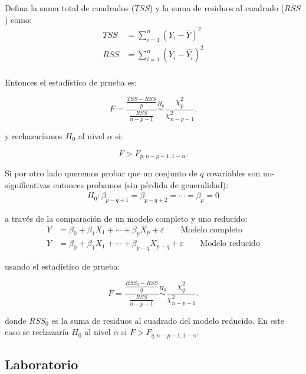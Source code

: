 \documentclass[
  12pt,
]{book}
\theoremstyle{definition}
\theoremstyle{definition}
\theoremstyle{definition}
\theoremstyle{definition}
\theoremstyle{remark}
\begin{document}
Defina la suma total de cuadrados (\(TSS\)) y la suma de residuos al cuadrado (\(RSS\)) como:
\begin{align*}
 TSS &= \sum_{i=1}^{n} \left( Y_{i} -\overline{Y} \right)^{2} \\
 RSS &= \sum_{i=1}^{n} \left( Y_{i} -\hat{Y_i} \right)^{2} \\
 \end{align*}

Entonces el estadístico de prueba es:

\begin{equation*}
 F = \frac{\frac{TSS-RSS}{p}}{\frac{RSS}{n-p-1}} \stackrel{H_0}{\sim} \frac{\chi^{2}_{p}}{\chi^{2}_{n-p-1}}.
 \end{equation*}

y rechazaríamos \(H_{0}\) al nivel \(\alpha\) si:

\begin{equation*}
 F > F_{p, n-p-1, 1-\alpha}.
 \end{equation*}

Si por otro lado queremos probar que un conjunto de \(q\) covariables son no-significativas entonces probamos (sin pérdida de generalidad):
\begin{align*}
H_0: \beta_{p-q+1}=\beta_{p-q+2}=\cdots=\beta_p=0
\end{align*}

a través de la comparación de un modelo completo y uno reducido:
\begin{align*}
Y&=\beta_{0}+ \beta_{1}X_{1} + \cdots + \beta_{p}X_{p} + \varepsilon \qquad \text{Modelo completo} \\
Y&=\beta_{0}+ \beta_{1}X_{1} + \cdots + \beta_{p-q}X_{p-q} + \varepsilon \qquad \text{Modelo reducido}
\end{align*}

usando el estadístico de prueba:

\begin{equation*}
 F = \frac{\frac{RSS_0-RSS}{q}}{\frac{RSS}{n-p-1}} \stackrel{H_0}{\sim} \frac{\chi^{2}_{q}}{\chi^{2}_{n-p-1}}.
 \end{equation*}

donde \(RSS_0\) es la suma de residuos al cuadrado del modelo reducido. En este caso se rechazaría \(H_0\) al nivel \(\alpha\) si \(F>F_{q, n-p-1, 1-\alpha}\).

\hypertarget{laboratorio-2}{%
\subsection{Laboratorio}\label{laboratorio-2}}
\end{document}
